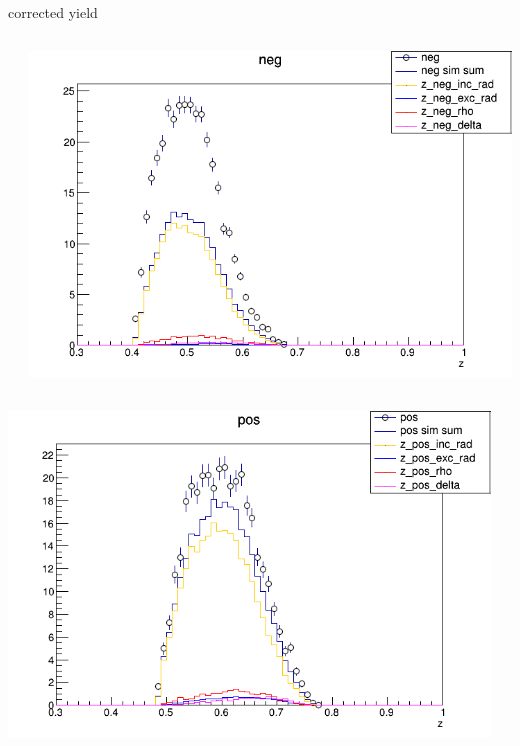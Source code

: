 \begin{frame}{corrected yield}
\begin{columns}
\begin{column}[T]{0.25\textwidth}
\end{column}
\begin{column}[T]{0.25\textwidth}
\includegraphics[width = \textwidth]{results/yield/statistics_corr/yield_x_Q2_z_0.50_3.979_0.50_neg.png}
\end{column}
\end{columns}
\begin{columns}
\begin{column}[T]{0.25\textwidth}
\includegraphics[width = \textwidth]{results/yield/statistics_corr/yield_x_Q2_z_0.50_3.979_0.60_pos.png}
\end{column}
\begin{column}[T]{0.25\textwidth}

\end{column}
\end{columns}
\end{frame}
